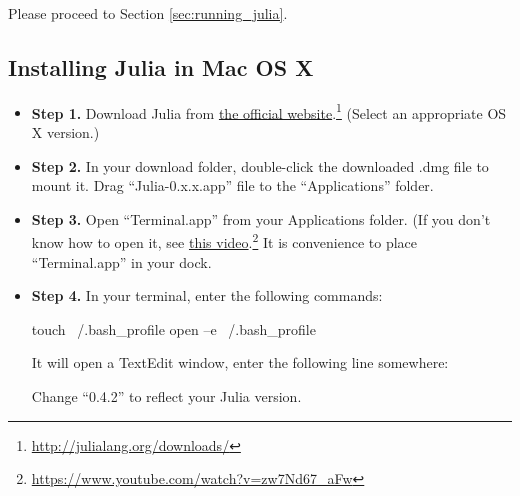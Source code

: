 Please proceed to Section \ref{sec:running_julia}.










\subsection{Installing Julia in Mac OS X} \label{sec:julia_mac}

\begin{itemize}
\item \textbf{Step 1.} Download Julia from \href{http://julialang.org/downloads/}{the official website}.\footnote{\url{http://julialang.org/downloads/}} (Select an appropriate OS X version.)



\item \textbf{Step 2.} In your download folder, double-click the downloaded .dmg file to mount it. Drag ``Julia-0.x.x.app'' file to the ``Applications'' folder.




\item \textbf{Step 3.} Open ``Terminal.app'' from your Applications folder. (If you don’t know how to open it, see \href{https://www.youtube.com/watch?v=zw7Nd67_aFw}{this video}.\footnote{\url{https://www.youtube.com/watch?v=zw7Nd67_aFw}} It is convenience to place ``Terminal.app'' in your dock.




\item \textbf{Step 4.} In your terminal, enter the following commands:
\begin{code}
touch ~/.bash_profile
open –e ~/.bash_profile
\end{code}


It will open a TextEdit window, enter the following line somewhere:
\noindent Change “0.4.2” to reflect your Julia version.


\end{itemize}
